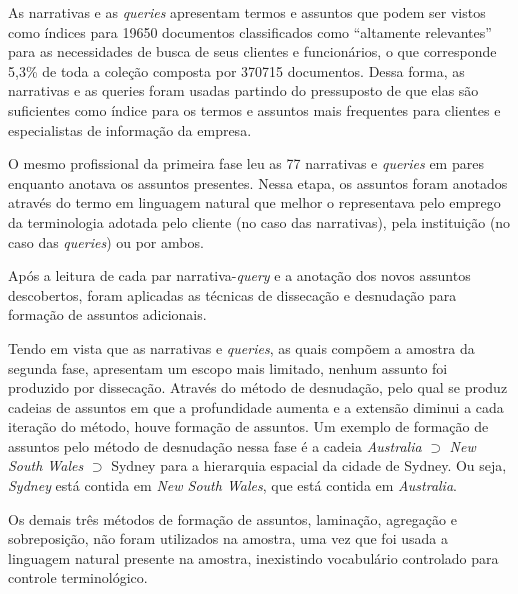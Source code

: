As narrativas e as \textit{queries} apresentam termos e assuntos que podem ser vistos como índices para 19650 documentos classificados como ``altamente relevantes'' para as necessidades de busca de seus clientes e funcionários, o que corresponde 5,3\% de toda a coleção composta por 370715 documentos. Dessa forma, as narrativas e as queries foram usadas partindo do pressuposto de que elas são suficientes como índice para os termos e assuntos mais frequentes para clientes e especialistas de informação da empresa.

O mesmo profissional da primeira fase leu as 77 narrativas e \textit{queries} em pares enquanto anotava os assuntos presentes. Nessa etapa, os assuntos foram anotados através do termo em linguagem natural que melhor o representava pelo emprego da terminologia adotada pelo cliente (no caso das narrativas), pela instituição (no caso das \textit{queries}) ou por ambos.

Após a leitura de cada par narrativa-\textit{query} e a anotação dos novos assuntos descobertos, foram aplicadas as técnicas de dissecação e desnudação para formação de assuntos adicionais. 

Tendo em vista que as narrativas e \textit{queries}, as quais compõem a amostra da segunda fase, apresentam um escopo mais limitado, nenhum assunto foi produzido por dissecação. Através do método de desnudação, pelo qual se produz cadeias de assuntos em que a profundidade aumenta e a extensão diminui a cada iteração do método, houve formação de assuntos.
Um exemplo de formação de assuntos pelo método de desnudação nessa fase é a cadeia \textit{Australia} $\supset$ \textit{New South Wales} $\supset$ Sydney para a hierarquia espacial da cidade de Sydney.
Ou seja, \textit{Sydney} está contida em \textit{New South Wales}, que está contida em \textit{Australia}.

Os demais três métodos de formação de assuntos, laminação, agregação e sobreposição, não foram utilizados na amostra, uma vez que foi usada a linguagem natural presente na amostra, inexistindo vocabulário controlado para controle terminológico.

